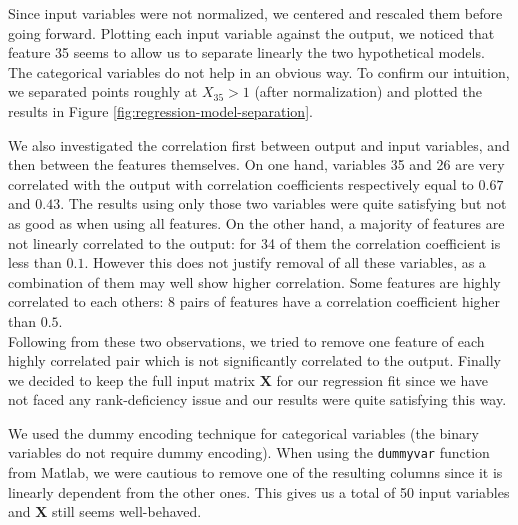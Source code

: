 \documentclass{article} %
\begin{document}
  Since input variables were not normalized, we centered and rescaled them before going forward. Plotting each input variable against the output, we noticed that feature 35 seems to allow us to separate linearly the two hypothetical models. The categorical variables do not help in an obvious way. To confirm our intuition, we separated points roughly at $X_{35} > 1$ (after normalization) and plotted the results in Figure \ref{fig:regression-model-separation}.

  We also investigated the correlation first between output and input variables, and then between the features themselves. On one hand, variables 35 and 26 are very correlated with the output with correlation coefficients respectively equal to $0.67$ and $0.43$. The results using only those two variables were quite satisfying but not as good as when using all features. On the other hand, a majority of features are not linearly correlated to the output: for 34 of them the correlation coefficient is less than $0.1$. However this does not justify removal of all these variables, as a combination of them may well show higher correlation. Some features are highly correlated to each others: 8 pairs of features have a correlation coefficient higher than $0.5$.\\
  Following from these two observations, we tried to remove one feature of each highly correlated pair which is not significantly correlated to the output. Finally we decided to keep the full input matrix $\mathbf{X}$ for our regression fit since we have not faced any rank-deficiency issue and our results were quite satisfying this way.

  We used the dummy encoding technique for categorical variables (the binary variables do not require dummy encoding). When using the \texttt{dummyvar} function from Matlab, we were cautious to remove one of the resulting columns since it is linearly dependent from the other ones. This gives us a total of 50 input variables and $\mathbf{X}$ still seems well-behaved.
\end{document}
